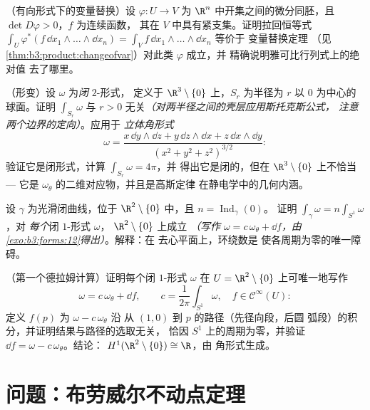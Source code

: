 \begin{exercise}[$\star\star$]\label{exo:b3:forms:9}
（有向形式下的变量替换）设 $\varphi\colon U
\to V$ 为 $\R^n$ 中开集之间的微分同胚，且 $\det
D\varphi > 0$，$f$ 为连续函数，
其在 $V$ 中具有紧支集。证明拉回恒等式
$\int_U\varphi^*(f\,\dd x_1\wedge\dots\wedge\dd x_n) =
\int_Vf\,\dd x_1\wedge\dots\wedge\dd x_n$ 等价于
变量替换定理
（见\cref{thm:b3:product:changeofvar}）对此类 $\varphi$ 成立，并
精确说明雅可比行列式上的绝对值
去了哪里。
\end{exercise}

\begin{exercise}[$\star\star\star$]\label{exo:b3:forms:10}
（形变）设 $\omega$ 为\emph{闭} $2$-形式，
定义于 $\R^3\setminus\{0\}$ 上，$S_r$ 为半径为 $r$
以 $0$ 为中心的球面。证明 $\int_{S_r}\omega$
与 $r > 0$ 无关\emph{（对两半径之间的壳层应用斯托克斯公式，
注意两个边界的定向）}。应用于
\emph{立体角形式}
\[
\omega = \frac{x\,\dd y\wedge\dd z + y\,\dd z\wedge\dd x +
z\,\dd x\wedge\dd y}{(x^2 + y^2 + z^2)^{3/2}} :
\]
验证它是闭形式，计算 $\int_{S_r}\omega = 4\pi$，并
得出它是闭的，但在
$\R^3\setminus\{0\}$ 上不恰当 --- 它是
$\omega_\theta$ 的二维对应物，并且是高斯定律
在静电学中的几何内涵。
\end{exercise}

\begin{exercise}[$\star\star$]\label{exo:b3:forms:11}
设 $\gamma$ 为光滑闭曲线，位于
$\R^2\setminus\{0\}$ 中，且 $n = \operatorname{Ind}_\gamma(0)$。
证明 $\int_\gamma\omega = n\int_{S^1}\omega$，对
\emph{每个}闭 $1$-形式 $\omega$，
$\R^2\setminus\{0\}$ 上成立 \emph{（写作 $\omega = c\,\omega_\theta
+ \dd f$，由\cref{exo:b3:forms:12}得出）}。解释：在
去心平面上，环绕数是
使各周期为零的唯一障碍。
\end{exercise}

\begin{exercise}[$\star\star\star$]\label{exo:b3:forms:12}
（第一个德拉姆计算）证明每个闭 $1$-形式
$\omega$ 在 $U = \R^2\setminus\{0\}$ 上可唯一地写作
\[
\omega = c\,\omega_\theta + \dd f,
\qquad c = \frac1{2\pi}\int_{S^1}\omega,\quad f \in
\mathcal C^\infty(U) :
\]
定义 $f(p)$ 为 $\omega - c\,\omega_\theta$ 沿
从 $(1,0)$ 到 $p$ 的路径（先径向段，后圆
弧段）的积分，并证明结果与路径的选取无关，
恰因 $S^1$ 上的周期为零，并验证 $\dd
f = \omega - c\,\omega_\theta$。结论：
$H^1(\R^2\setminus\{0\}) \cong \R$，由
角形式生成。
\end{exercise}

\section{问题：布劳威尔不动点定理}

